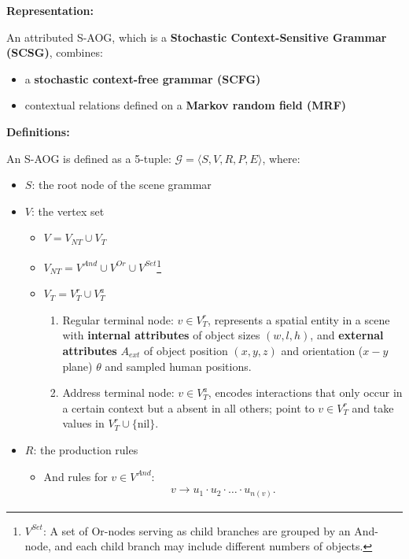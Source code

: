 \documentclass[10pt]{article}
\begin{document}
\textbf{Representation:}

An attributed S-AOG, which is a \textbf{Stochastic Context-Sensitive Grammar
(SCSG)}, combines:
%
\begin{itemize}
  \item a \textbf{stochastic context-free grammar (SCFG)}
  \item contextual relations defined on a \textbf{Markov random field (MRF)}
\end{itemize}

\textbf{Definitions:}

An S-AOG is defined as a 5-tuple: $\mathcal{G} = \langle S, V, R, P, E \rangle$,
where:
%
\begin{itemize}
  \item $S$: the root node of the scene grammar
  \item $V$: the vertex set
    \begin{itemize}
      \item $V = V_{NT} \cup V_T$
      \item $V_{NT} = V^{And} \cup V^{Or} \cup V^{Set}$\footnote{$V^{Set}$: A
          set of Or-nodes serving as child branches are grouped by an And-node,
          and each child branch may include different numbers of objects.}
      \item $V_T = V^r_T \cup V^a_T$
        \begin{enumerate}
          \item Regular terminal node: $v \in V^r_T$, represents a spatial
            entity in a scene with \textbf{internal attributes} of object sizes
            $(w, l, h)$, and \textbf{external attributes} $A_{ext}$ of
            object position $(x, y, z)$ and orientation ($x - y$ plane)
            $\theta$ and sampled human positions.
          \item Address terminal node: $v \in V^a_T$, encodes interactions that
            only occur in a certain context but a absent in all others; point
            to $v \in V^r_T$ and take values in $V^r_T \cup \{\text{nil}\}$.
        \end{enumerate}
    \end{itemize}
  \item $R$: the production rules
    \begin{itemize}
      \item And rules for $v \in V^{And}$:
        \begin{align}
          \label{eq:1}
          v \rightarrow u_1 \cdot u_2 \cdot \ldots \cdot u_{n(v)}.

\end{align}
\end{itemize}
\end{itemize}
\end{document}
